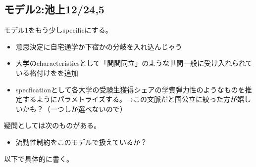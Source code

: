 \documentclass{jsarticle}
\begin{document}
	\subsection{モデル2:池上12/24,5}
	\par
	モデル1をもう少しspecificにする。
	\begin{itemize}
		\item 意思決定に自宅通学か下宿かの分岐を入れ込んじゃう
		\item 大学のcharacteristicsとして「関関同立」のような世間一般に受け入れられている格付けをを追加
		\item specficationとして各大学の受験生獲得シェアの学費弾力性のようなものを推定するようにパラメトライズする。→この文脈だと国公立に絞った方が嬉しいかも？（一つしか選べないので）
	\end{itemize}
	\par
	疑問としては次のものがある。
	\begin{itemize}
		\item 流動性制約をこのモデルで扱えているか？
	\end{itemize}
	\par
	以下で具体的に書く。
	
\end{document}
